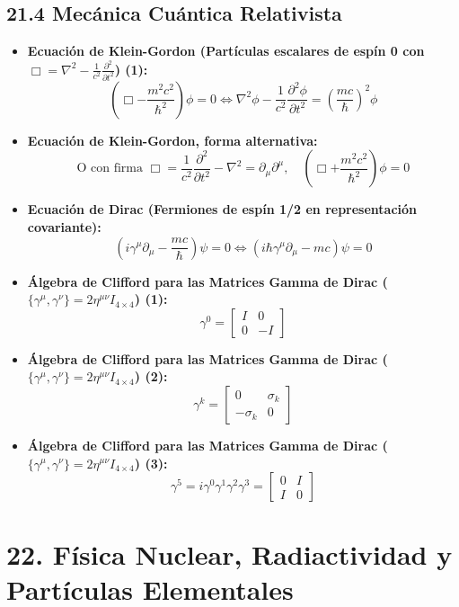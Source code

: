 \documentclass[11pt,a4paper]{article}
\begin{document}
\subsection*{21.4 Mecánica Cuántica Relativista}

\begin{itemize}
  \item \textbf{Ecuación de Klein-Gordon (Partículas escalares de espín 0 con $\Box = \nabla^2 - \frac{1}{c^2}\frac{\partial^2}{\partial t^2}$) (1):}
  \[
    \left( \Box - \frac{m^2 c^2}{\hbar^2} \right) \phi = 0 \iff \nabla^2\phi - \frac{1}{c^2}\frac{\partial^2\phi}{\partial t^2} = \left(\frac{mc}{\hbar}\right)^2 \phi
  \]
  \item \textbf{Ecuación de Klein-Gordon, forma alternativa:}
  \[
    \text{O con firma } \Box = \frac{1}{c^2}\frac{\partial^2}{\partial t^2} - \nabla^2 = \partial_\mu \partial^\mu, \quad (\Box + \frac{m^2 c^2}{\hbar^2})\phi = 0
  \]
  \item \textbf{Ecuación de Dirac (Fermiones de espín 1/2 en representación covariante):}
  \[
    (i\gamma^\mu \partial_\mu - \frac{mc}{\hbar})\psi = 0 \iff (i\hbar \gamma^\mu \partial_\mu - mc)\psi = 0
  \]
  \item \textbf{Álgebra de Clifford para las Matrices Gamma de Dirac ($\{\gamma^\mu, \gamma^\nu\} = 2\eta^{\mu\nu} I_{4\times4}$) (1):}
  \[
    \gamma^0 = \begin{bmatrix} I & 0 \\ 0 & -I \end{bmatrix}
  \]
  \item \textbf{Álgebra de Clifford para las Matrices Gamma de Dirac ($\{\gamma^\mu, \gamma^\nu\} = 2\eta^{\mu\nu} I_{4\times4}$) (2):}
  \[
    \gamma^k = \begin{bmatrix} 0 & \sigma_k \\ -\sigma_k & 0 \end{bmatrix}
  \]
  \item \textbf{Álgebra de Clifford para las Matrices Gamma de Dirac ($\{\gamma^\mu, \gamma^\nu\} = 2\eta^{\mu\nu} I_{4\times4}$) (3):}
  \[
    \gamma^5 = i\gamma^0 \gamma^1 \gamma^2 \gamma^3 = \begin{bmatrix} 0 & I \\ I & 0 \end{bmatrix}
  \]
\end{itemize}

\section*{22. Física Nuclear, Radiactividad y Partículas Elementales}
\end{document}
